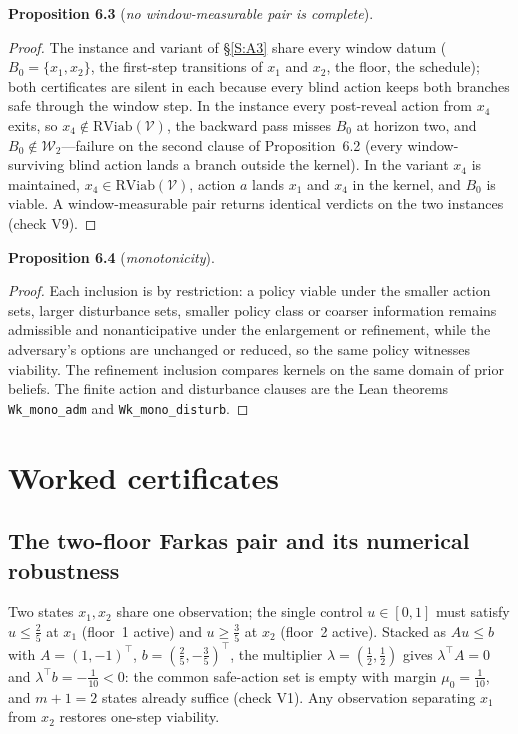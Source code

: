 \documentclass[11pt,a4paper]{article}
\theoremstyle{plain}
\theoremstyle{definition}
\theoremstyle{remark}
\newenvironment{restated}[2]{\par\medskip\noindent\textbf{#1} (\textit{#2}).\ \itshape}{\par\medskip}
\newcommand{\RViab}{\mathrm{RViab}}
\newcommand{\cV}{\mathcal{V}}
\newcommand{\cW}{\mathcal{W}}
\begin{document}
\begin{restated}{Proposition 6.3}{no window-measurable pair is complete}
\end{restated}

\begin{proof}
The instance and variant of \S\ref{S:A3} share every window datum ($B_0=\{x_1,x_2\}$, the first-step transitions of $x_1$ and $x_2$, the floor, the schedule); both certificates are silent in each because every blind action keeps both branches safe through the window step. In the instance every post-reveal action from $x_4$ exits, so $x_4\notin\RViab(\cV)$, the backward pass misses $B_0$ at horizon two, and $B_0\notin\cW_2$---failure on the second clause of Proposition~6.2 (every window-surviving blind action lands a branch outside the kernel). In the variant $x_4$ is maintained, $x_4\in\RViab(\cV)$, action $a$ lands $x_1$ and $x_4$ in the kernel, and $B_0$ is viable. A window-measurable pair returns identical verdicts on the two instances (check V9).
\end{proof}

\begin{restated}{Proposition 6.4}{monotonicity}
\end{restated}

\begin{proof}
Each inclusion is by restriction: a policy viable under the smaller action sets, larger disturbance sets, smaller policy class or coarser information remains admissible and nonanticipative under the enlargement or refinement, while the adversary's options are unchanged or reduced, so the same policy witnesses viability. The refinement inclusion compares kernels on the same domain of prior beliefs. The finite action and disturbance clauses are the Lean theorems \texttt{Wk\_mono\_adm} and \texttt{Wk\_mono\_disturb}.
\end{proof}
\section{Worked certificates}\label{S:worked}

\subsection{The two-floor Farkas pair and its numerical robustness}\label{S:farkas}
Two states $x_1,x_2$ share one observation; the single control $u\in[0,1]$ must satisfy $u\le\tfrac25$ at $x_1$ (floor~1 active) and $u\ge\tfrac35$ at $x_2$ (floor~2 active). Stacked as $Au\le b$ with $A=(1,-1)^\top$, $b=(\tfrac25,-\tfrac35)^\top$, the multiplier $\lambda=(\tfrac12,\tfrac12)$ gives $\lambda^\top A=0$ and $\lambda^\top b=-\tfrac1{10}<0$: the common safe-action set is empty with margin $\mu_0=\tfrac1{10}$, and $m+1=2$ states already suffice (check V1). Any observation separating $x_1$ from $x_2$ restores one-step viability.
\end{document}
